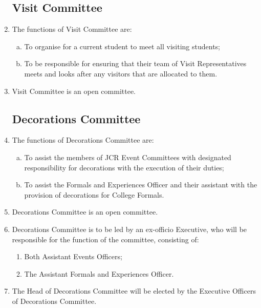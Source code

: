 \documentclass[12pt]{article}
\begin{document}
\begin{enumerate}
    \subsection{Visit Committee}
    \item The functions of Visit Committee are:
    \begin{enumerate}[(a)]
        \item To organise for a current student to meet all visiting students;
        \item To be responsible for ensuring that their team of Visit Representatives meets and looks after any visitors that are allocated to them.
    \end{enumerate}
    \item Visit Committee is an open committee.

    \subsection{Decorations Committee}
    \item The functions of Decorations Committee are:
    \begin{enumerate}[(a)]
        \item To assist the members of JCR Event Committees with designated responsibility for decorations with the execution of their duties;
        \item To assist the Formals and Experiences Officer and their assistant with the provision of decorations for College Formals.
    \end{enumerate}
    \item Decorations Committee is an open committee.
    \item Decorations Committee is to be led by an ex-officio Executive, who will be responsible for the function of the committee, consisting of:
    \begin{enumerate}
        \item Both Assistant Events Officers;
        \item The Assistant Formals and Experiences Officer.
    \end{enumerate}
    \item The Head of Decorations Committee will be elected by the Executive Officers of Decorations Committee.


\end{enumerate}
\end{document}
